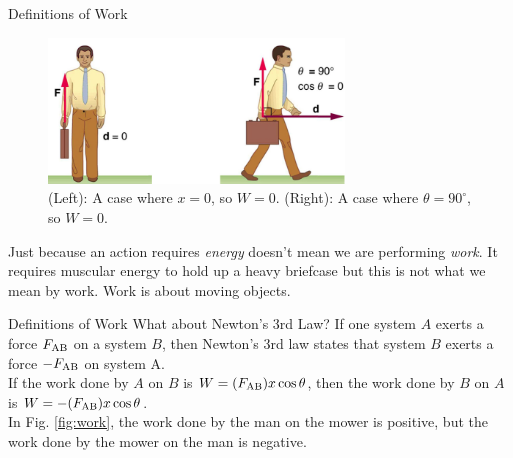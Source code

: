 \documentclass{beamer}
\begin{document}
\begin{frame}{Definitions of Work}
\begin{figure}
\centering
\includegraphics[width=0.7\textwidth]{figures/lawn2.png}
\caption{\label{fig:work2} (Left): A case where $x = 0$, so $W=0$.  (Right): A case where $\theta = 90^{\circ}$, so $W=0$.}
\end{figure}
\small
Just because an action requires \textit{energy} doesn't mean we are performing \textit{work}.  It requires muscular energy to hold up a heavy briefcase but this is not what we mean by work.  Work is about moving objects.
\end{frame}

\begin{frame}{Definitions of Work}
What about Newton's 3rd Law?  If one system $A$ exerts a force $F_{\rm AB}$ on a system $B$, then Newton's 3rd law states that system $B$ exerts a force $-F_{\rm AB}$ on system A. \\
\vspace{0.5cm}
If \alert{the work done by $A$ on $B$} is $W = (F_{\rm AB})x\cos\theta$, then \alert{the work done by $B$ on $A$} is $W = -(F_{\rm AB})x\cos\theta$. \\
\vspace{0.5cm}
In Fig. \ref{fig:work}, the work done by the man on the mower is positive, but the work done by the mower on the man is negative.
\end{frame}
\end{document}
